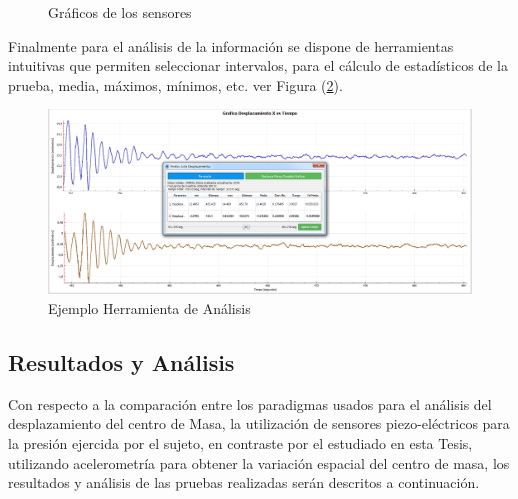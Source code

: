 \documentclass[12pt,a4paper]{article}
\begin{document}
\begin{figure}[H]
	\centering
	\caption{Gráficos de los sensores}
	\label{fig:Graficosensores}
\end{figure}

Finalmente para el análisis de la información se dispone de herramientas intuitivas que permiten seleccionar intervalos, para el cálculo de estadísticos de la prueba, media, máximos, mínimos, etc. ver Figura (\ref{fig:analsisGraficos}).

\begin{figure}[H]
	\centering
	\includegraphics[scale=0.3]{images/analisisGraficos}
	\caption{Ejemplo Herramienta de Análisis}
	\label{fig:analsisGraficos}
\end{figure}

\newpage
\subsection{Resultados y Análisis}
Con respecto a la comparación entre los paradigmas usados para el análisis del desplazamiento del centro de Masa, la utilización de sensores piezo-eléctricos para la presión ejercida por el sujeto, en contraste por el estudiado en esta Tesis, utilizando acelerometría para obtener la variación espacial del centro de masa, los resultados y análisis de las pruebas realizadas serán descritos a continuación.
\end{document}
